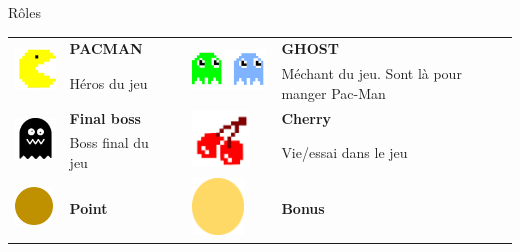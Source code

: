 \documentclass{beamer}
\begin{document}
\begin{frame}{Rôles}
    \begin{table}
        \centering
            \begin{tabular}{lp{2cm}p{0.5cm}lp{2cm}}
                \multirow{2}{*}{\includegraphics[height=1.5cm]{pacMan.png}}      & \textbf{PACMAN}                         & & \multirow{2}{*}{\includegraphics[height=1.5cm]{ghost.png}}    & \textbf{GHOST}                                              \\
                                                                                 & {\footnotesize Héros du jeu}            & &                                                               & {\footnotesize Méchant du jeu. Sont là pour manger Pac-Man} \\
                \multirow{2}{*}{\includegraphics[height=1.5cm]{finalBoss.png}}   & \textbf{Final boss}                     & & \multirow{2}{*}{\includegraphics[height=1.5cm]{cherry.png}}   & \textbf{Cherry}                                             \\
                                                                                 & {\footnotesize Boss final du jeu}       & &                                                               & {\footnotesize Vie/essai dans le jeu}                       \\
                \multirow{2}{*}{\includegraphics[height=1.0cm]{littlePoint.png}} & \textbf{Point}                          & & \multirow{2}{*}{\includegraphics[height=1.5cm]{bigPoint.png}} & \textbf{Bonus}                                              \\

\end{tabular}
\end{table}
\end{frame}
\end{document}
